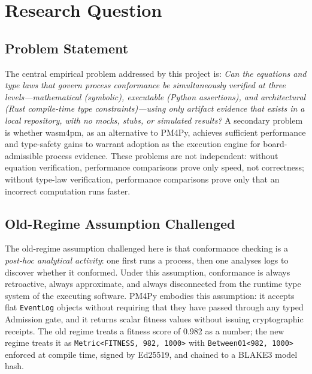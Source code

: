 
\section{Research Question}
\label{sec:experiments-core-rq}

\subsection{Problem Statement}
\label{sec:experiments-core-rq-problem}

The central empirical problem addressed by this project is: \emph{Can the equations
and type laws that govern process conformance be simultaneously verified at three
levels---mathematical (symbolic), executable (Python assertions), and architectural
(Rust compile-time type constraints)---using only artifact evidence that exists in
a local repository, with no mocks, stubs, or simulated results?} A secondary problem
is whether wasm4pm, as an alternative to PM4Py, achieves sufficient performance
and type-safety gains to warrant adoption as the execution engine for board-admissible
process evidence. These problems are not independent: without equation verification,
performance comparisons prove only speed, not correctness; without type-law verification,
performance comparisons prove only that an incorrect computation runs faster.

\subsection{Old-Regime Assumption Challenged}
\label{sec:experiments-core-rq-old-regime}

The old-regime assumption challenged here is that conformance checking is a
\emph{post-hoc analytical activity}: one first runs a process, then one analyses
logs to discover whether it conformed. Under this assumption, conformance is always
retroactive, always approximate, and always disconnected from the runtime type system
of the executing software. PM4Py embodies this assumption: it accepts flat
\texttt{EventLog} objects without requiring that they have passed through any typed
Admission gate, and it returns scalar fitness values without issuing cryptographic
receipts. The old regime treats a fitness score of 0.982 as a number; the new regime
treats it as \texttt{Metric<FITNESS, 982, 1000>} with \texttt{Between01<982, 1000>}
enforced at compile time, signed by Ed25519, and chained to a BLAKE3 model hash.

